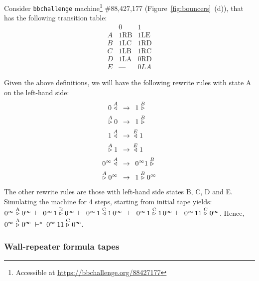 \begin{example}\label{ex:bouncer88427177}
    Consider \texttt{bbchallenge} machine\footnote{Accessible at \url{https://bbchallenge.org/88427177}} \#88,427,177 (Figure~\ref{fig:bouncers}~(d)), that has the following transition table:
    \[
        \begin{array}{l|ll}
              & 0          & 1          \\
            \hline
            A & 1\text{RB} & 1\text{LE} \\
            B & 1\text{LC} & 1\text{RD} \\
            C & 1\text{LB} & 1\text{RC} \\
            D & 1\text{LA} & 0\text{RD} \\
            E & \mbox{---} & 0LA
        \end{array}
    \]

    Given the above definitions, we will have the following rewrite rules with state A on the left-hand side:
    \begin{align*}
        0 \stackrel{A}\triangleleft\,\,\,        & \to\,\,\, 1 \stackrel{B}\triangleright          \\
        \stackrel{A}\triangleright 0\,\,\,        & \to\,\,\, 1 \stackrel{B}\triangleright          \\
        1 \stackrel{A}\triangleleft\,\,\,        & \to\,\,\, \stackrel{E}\triangleleft 1          \\
        \stackrel{A}\triangleright 1\,\,\,        & \to\,\,\, \stackrel{E}\triangleleft 1          \\
        0^\infty \stackrel{A}\triangleleft\,\,\, & \to\,\,\, 0^\infty 1 \stackrel{B}\triangleright \\
        \stackrel{A}\triangleright 0^\infty\,\,\, & \to\,\,\, 1 \stackrel{B}\triangleright 0^\infty
    \end{align*}
    The other rewrite rules are those with left-hand side states B, C, D and E. Simulating the machine for 4 steps, starting from initial tape yields:
    $ 0^\infty \rhead{\text{A}} 0^\infty \;\vdash\; 0^\infty \, 1 \rhead{\text{B}} 0^\infty \;\vdash\; 0^\infty \, 1 \lhead{\text{C}} 1\, 0^\infty\ \;\vdash\; 0^\infty \, 1 \rhead{\text{C}} 1\, 0^\infty \;\vdash\; 0^\infty \, 1 1 \rhead{\text{C}} 0^\infty$. Hence, $0^\infty \stackrel{\text{A}}\triangleright 0^\infty \;\vdash^*\; 0^\infty \, 1 1 \stackrel{\text{C}}\triangleright 0^\infty$.
\end{example}

\subsubsection{Wall-repeater formula tapes}\label{sec:bouncers:formula-tapes}

